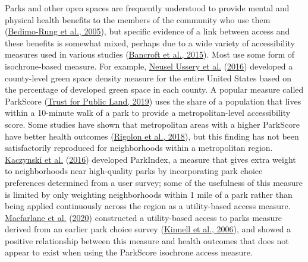 \documentclass[3p, authoryear, review]{elsarticle} %
\begin{document}
Parks and other open spaces are frequently understood to provide mental and physical
health benefits to the members of the community who use them (\protect\hyperlink{ref-bedimo2005}{Bedimo-Rung et al., 2005}), but
specific evidence of a link between access and these benefits is somewhat mixed,
perhaps due to a wide variety of accessibility measures used in various studies
(\protect\hyperlink{ref-bancroft2015association}{Bancroft et al., 2015}). Most use some form of isochrone-based measure. For example,
\protect\hyperlink{ref-neusel2016}{Neusel Ussery et al.} (\protect\hyperlink{ref-neusel2016}{2016}) developed a county-level green space density measure for the entire United
States based on the percentage of developed green space in each county.
A popular measure called ParkScore (\protect\hyperlink{ref-parkscore2019}{Trust for Public Land, 2019}) uses the share of a
population that lives within a 10-minute walk of a park to provide a metropolitan-level
accessibility score. Some studies have shown that metropolitan areas with a higher
ParkScore have better health outcomes (\protect\hyperlink{ref-rigolon2018}{Rigolon et al., 2018}), but this finding has not
been satisfactorily reproduced for neighborhoods within a metropolitan region.
\protect\hyperlink{ref-kacynski2016}{Kaczynski et al.} (\protect\hyperlink{ref-kacynski2016}{2016}) developed ParkIndex, a
measure that gives extra weight to neighborhoods near high-quality parks by
incorporating park choice preferences determined from a user survey; some of the
usefulness of this measure is limited by only weighting neighborhoods within 1
mile of a park rather than being applied continuously across the region as a utility-based
access measure. \protect\hyperlink{ref-macfarlane2020}{Macfarlane et al.} (\protect\hyperlink{ref-macfarlane2020}{2020}) constructed a utility-based access to parks
measure derived from an earlier park choice survey (\protect\hyperlink{ref-kinnell2006}{Kinnell et al., 2006}), and showed a
positive relationship between this measure and health outcomes that does not
appear to exist when using the ParkScore isochrone access measure.
\end{document}
